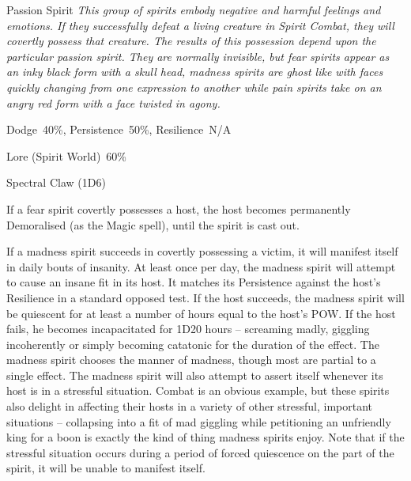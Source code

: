 \begin{samepage}
\begin{monsterbox}{Passion Spirit}
	\textit{This group of spirits embody negative and harmful feelings and emotions. If they successfully defeat a living creature in Spirit Combat, they will covertly possess that creature. The results of this possession depend upon the particular passion spirit. They are normally invisible, but fear spirits appear as an inky black form with a skull head, madness spirits are ghost like with faces quickly changing from one expression to another while pain spirits take on an angry red form with a face twisted in agony.}\\
	\rpghline
	\basics[%
	powerpoints = 17,
	movementrate = 30m,
	plunderrating = 0
	]
	\rpghline%
	\stats[ %
		STR = -,
		CON = -,
		DEX = -,
		SIZ = -,
		INT = 2D6+3  (10),
		POW = 3D6+6  (17),
		CHA = 4D6    (14)
	]
	\rpghline%
	\begin{rpg-monsteraction}[Resistances]
		Dodge~40\%, Persistence~50\%, Resilience~N/A
	\end{rpg-monsteraction}
	\begin{rpg-monsteraction}[Knowledge]
		Lore (Spirit World)~60\%
	\end{rpg-monsteraction}
	\begin{rpg-monsteraction}
		Spectral Claw (1D6)
	\end{rpg-monsteraction}
	\begin{rpg-monsteraction}
		If a fear spirit covertly possesses a host, the host becomes permanently Demoralised (as the Magic spell), until the spirit is cast out.
	\end{rpg-monsteraction}
	\begin{rpg-monsteraction}
		If a madness spirit succeeds in covertly possessing a victim, it will manifest itself in daily bouts of insanity. At least once per day, the madness spirit will attempt to cause an insane fit in its host. It matches its Persistence against the host’s Resilience in a standard opposed test. If the host succeeds, the madness spirit will be quiescent for at least a number of hours equal to the host’s POW. If the host fails, he becomes incapacitated for 1D20 hours – screaming madly, giggling incoherently or simply becoming catatonic for the duration of the effect. The madness spirit chooses the manner of madness, though most are partial to a single effect. The madness spirit will also attempt to assert itself whenever its host is in a stressful situation. Combat is an obvious example, but these spirits also delight in affecting their hosts in a variety of other stressful, important situations – collapsing into a fit of mad giggling while petitioning an unfriendly king for a boon is exactly the kind of thing madness spirits enjoy. Note that if the stressful situation occurs during a period of forced quiescence on the part of the spirit, it will be unable to manifest itself.

\end{rpg-monsteraction}
\end{monsterbox}
\end{samepage}
